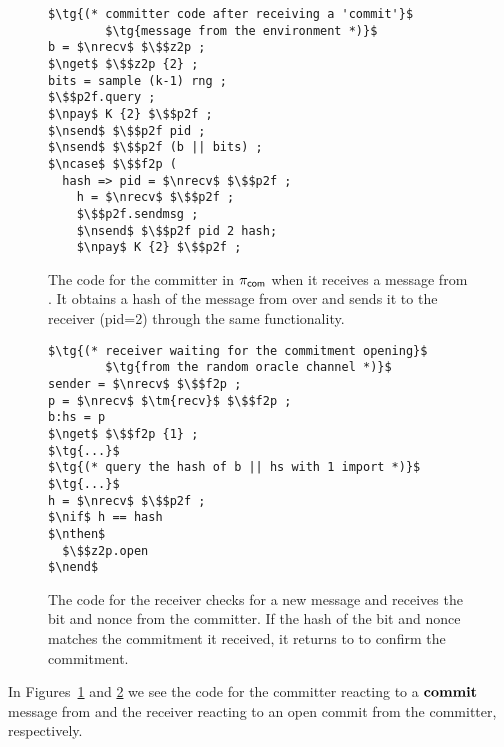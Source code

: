 \begin{figure}
\begin{lstlisting}[basicstyle=\footnotesize\BeraMonottFamily, frame=single, mathescape]
$\tg{(* committer code after receiving a 'commit'}$
        $\tg{message from the environment *)}$
b = $\nrecv$ $\$$z2p ;
$\nget$ $\$$z2p {2} ;
bits = sample (k-1) rng ;
$\$$p2f.query ;
$\npay$ K {2} $\$$p2f ;
$\nsend$ $\$$p2f pid ;
$\nsend$ $\$$p2f (b || bits) ;
$\ncase$ $\$$f2p (
  hash => pid = $\nrecv$ $\$$p2f ; 
    h = $\nrecv$ $\$$p2f ;
    $\$$p2f.sendmsg ;
    $\nsend$ $\$$p2f pid 2 hash;
	$\npay$ K {2} $\$$p2f ;
\end{lstlisting}
\caption{The code for the committer in $\pi_{{\mathsf {com}}}$ when it receives a  message from \Z. It obtains a hash of the message from \Fropp over  and sends it to the receiver (pid=2) through the same functionality.}
\label{lst:committer}
\vspace{-2mm}
\end{figure}

\begin{figure}
\begin{lstlisting}[basicstyle=\footnotesize\BeraMonottFamily, frame=single, mathescape]
$\tg{(* receiver waiting for the commitment opening}$
        $\tg{from the random oracle channel *)}$
sender = $\nrecv$ $\$$f2p ;
p = $\nrecv$ $\tm{recv}$ $\$$f2p ;
b:hs = p
$\nget$ $\$$f2p {1} ; 
$\tg{...}$
$\tg{(* query the hash of b || hs with 1 import *)}$
$\tg{...}$
h = $\nrecv$ $\$$p2f ;
$\nif$ h == hash
$\nthen$
  $\$$z2p.open
$\nend$
\end{lstlisting}
\caption{The code for the receiver checks for a new message and receives the bit and nonce from the committer. If the hash of the bit and nonce matches the commitment it received, it returns  to \Z to confirm the commitment.}
\label{lst:receiver}
\vspace{-3mm}
\end{figure}

In Figures~\ref{lst:committer} and \ref{lst:receiver} we see the code for the committer reacting to a $\mathbf{commit}$ message from \Z and the receiver reacting to an open commit from the committer, respectively. 

